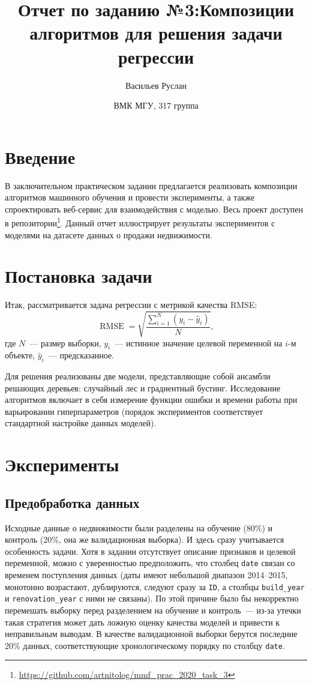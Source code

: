 \documentclass[12pt]{article}
\title{Отчет по заданию №3:\break Композиции алгоритмов для решения \break задачи регрессии}
\author{Васильев Руслан \and{ВМК МГУ, 317 группа}}
\begin{document}
\maketitle
\tableofcontents
\newpage
\section{Введение}
В заключительном практическом задании предлагается реализовать композиции алгоритмов машинного обучения и провести эксперименты, а также спроектировать веб-сервис для взаимодействия с моделью. Весь проект доступен в репозитории\footnote{\url{https://github.com/artnitolog/mmf_prac_2020_task_3}}. Данный отчет иллюстрирует результаты экспериментов с моделями на датасете данных о продажи недвижимости.

\section{Постановка задачи}

Итак, рассматривается задача регрессии с метрикой качества RMSE:
\begin{equation*}
    \operatorname{RMSE} = \sqrt{\frac{\sum_{i=1}^{N} (y_i - \hat{y}_i)}{N}},
\end{equation*}
где $N$~--- размер выборки, $y_i$~--- истинное значение целевой переменной на $i$-м объекте, $\hat{y}_i$~--- предсказанное.

Для решения реализованы две модели, представляющие собой ансамбли решающих деревьев: случайный лес и градиентный бустинг. Исследование алгоритмов включает в себя измерение функции ошибки и времени работы при варьировании гиперпараметров (порядок экспериментов соответствует стандартной настройке данных моделей).

\section{Эксперименты}
\subsection{Предобработка данных}
Исходные данные о недвижимости были разделены на обучение (80\%) и контроль (20\%, она же валидационная выборка). И здесь сразу учитывается особенность задачи. Хотя в задании отсутствует описание признаков и целевой переменной, можно с уверенностью предположить, что столбец \verb|date| связан со временем поступления данных (даты имеют небольшой диапазон 2014--2015, монотонно возрастают, дублируются, следуют сразу за \verb|ID|, а столбцы \verb|build_year| и \verb|renovation_year| с ними не связаны). По этой причине было бы некорректно перемешать выборку перед разделением на обучение и контроль~--- из-за утечки такая стратегия может дать ложную оценку качества моделей и привести к неправильным выводам. В качестве валидационной выборки берутся последние 20\% данных, соответствующие хронологическому порядку по столбцу \verb|date|.
\end{document}

